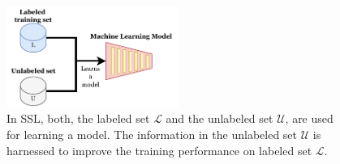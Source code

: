 \begin{figure}[htbp]
\centering
\captionsetup{format=plain}
\includegraphics[width=0.5\textwidth]{figures/fig_semi_supervised_learning.pdf}
\caption{In SSL, both, the labeled set $\mathcal{L}$ and the unlabeled set $\mathcal{U}$, are used for learning a model. The information in the unlabeled set $\mathcal{U}$ is harnessed to improve the training performance on labeled set $\mathcal{L}$.}
\label{fig:semi_supervised_learning}
\end{figure}

